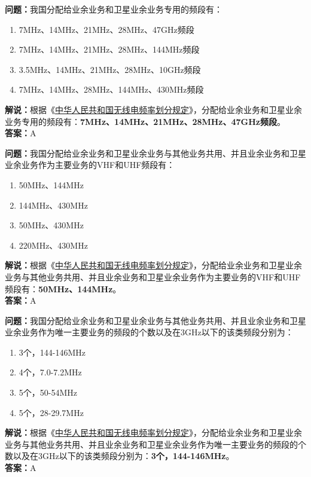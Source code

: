 \textbf{问题：}我国分配给业余业务和卫星业余业务专用的频段有：
\begin{enumerate}[label=\Alph*), leftmargin=1.5cm]
  \item 7MHz、14MHz、21MHz、28MHz、47GHz频段
  \item 7MHz、14MHz、21MHz、28MHz、144MHz频段
  \item 3.5MHz、14MHz、21MHz、28MHz、10GHz频段
  \item 7MHz、14MHz、28MHz、144MHz、430MHz频段
\end{enumerate}
\textbf{解说：}根据《\href{https://www.miit.gov.cn/zwgk/zcwj/wjfb/txy/art/2020/art_066386284cd2449493586c81ccafed11.html}{中华人民共和国无线电频率划分规定}》，分配给业余业务和卫星业余业务专用的频段有：\textbf{7MHz、14MHz、21MHz、28MHz、47GHz频段}。\\\textbf{答案：}A%

\textbf{问题：}我国分配给业余业务和卫星业余业务与其他业务共用、并且业余业务和卫星业余业务作为主要业务的VHF和UHF频段有：
\begin{enumerate}[label=\Alph*), leftmargin=1.5cm]
  \item 50MHz、144MHz
  \item 144MHz、430MHz
  \item 50MHz、430MHz
  \item 220MHz、430MHz
\end{enumerate}
\textbf{解说：}根据《\href{https://www.miit.gov.cn/zwgk/zcwj/wjfb/txy/art/2020/art_066386284cd2449493586c81ccafed11.html}{中华人民共和国无线电频率划分规定}》，分配给业余业务和卫星业余业务与其他业务共用、并且业余业务和卫星业余业务作为主要业务的VHF和UHF频段有：\textbf{50MHz、144MHz}。\\\textbf{答案：}A%

\textbf{问题：}我国分配给业余业务和卫星业余业务与其他业务共用、并且业余业务和卫星业余业务作为唯一主要业务的频段的个数以及在3GHz以下的该类频段分别为：
\begin{enumerate}[label=\Alph*), leftmargin=1.5cm]
  \item 3个，144-146MHz
  \item 4个，7.0-7.2MHz
  \item 5个，50-54MHz
  \item 5个，28-29.7MHz
\end{enumerate}
\textbf{解说：}根据《\href{https://www.miit.gov.cn/zwgk/zcwj/wjfb/txy/art/2020/art_066386284cd2449493586c81ccafed11.html}{中华人民共和国无线电频率划分规定}》，分配给业余业务和卫星业余业务与其他业务共用、并且业余业务和卫星业余业务作为唯一主要业务的频段的个数以及在3GHz以下的该类频段分别为：\textbf{3个，144-146MHz}。\\\textbf{答案：}A%

